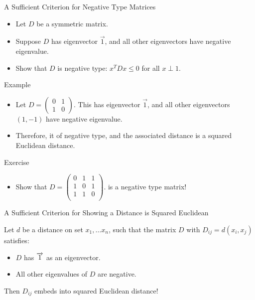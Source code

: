 \begin{frame}{A Sufficient Criterion for Negative Type Matrices}
  \begin{itemize}[<+->]
  \item Let $D$ be a symmetric matrix.
  \item Suppose $D$ has eigenvector $\overrightarrow{1}$, and all other
  eigenvectors have negative eigenvalue.
  \item Show that $D$ is negative type: $x^T D x \leq 0$
      for all $x \perp 1$.
  \end{itemize}
\end{frame}

 \begin{frame}{Example} 
   \begin{itemize}[<+->]
   \item Let 
   $ D = \begin{pmatrix} 
   0 & 1 \\
   1 & 0
   \end{pmatrix}.$
   This has eigenvector $\overrightarrow{1}$, and all other eigenvectors $(1,
       -1)$ have negative eigenvalue.
   \item Therefore, it of negative type, and the associated distance is
   a squared Euclidean distance.
   \end{itemize}
 \end{frame}

 \begin{frame}{Exercise} 
   \begin{itemize}[<+->]
   \item Show that
   $ D = \begin{pmatrix} 
   0 & 1 & 1\\
   1 & 0 & 1\\
   1 & 1 & 0\\
   \end{pmatrix}.$
   is a negative type matrix!
   \end{itemize}
 \end{frame}
\begin{frame}{A Sufficient Criterion for Showing a Distance is Squared
  Euclidean}

Let $d$ be a distance on set $x_1, \ldots x_n$, such that the matrix
$D$ with $D_{ij} = d(x_i, x_j)$ satisfies:
  \begin{itemize}
  \item $D$ has $\overrightarrow{1}$ as an eigenvector.
  \item  All other eigenvalues of $D$ are negative.
  \end{itemize}
  Then $D_{ij}$ embeds into squared Euclidean distance!
\end{frame}


